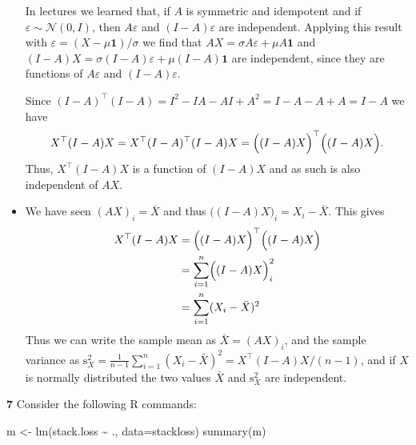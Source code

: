\documentclass[
  a4paper,
]{article}
\newenvironment{Shaded}{\begin{snugshade}}{\end{snugshade}}
\newcommand{\AttributeTok}[1]{\textcolor[rgb]{0.77,0.63,0.00}{#1}}
\newcommand{\FunctionTok}[1]{\textcolor[rgb]{0.00,0.00,0.00}{#1}}
\newcommand{\NormalTok}[1]{#1}
\newcommand{\OtherTok}[1]{\textcolor[rgb]{0.56,0.35,0.01}{#1}}
\newcommand{\SpecialCharTok}[1]{\textcolor[rgb]{0.00,0.00,0.00}{#1}}
\theoremstyle{definition}
\theoremstyle{definition}
\theoremstyle{definition}
\theoremstyle{definition}
\theoremstyle{remark}
\begin{document}
\begin{myanswers}
\begin{itemize}
  In lectures we learned that, if \(A\) is symmetric and idempotent
  and if \(\varepsilon\sim \mathcal{N}(0, I)\), then \(A\varepsilon\) and \((I-A)\varepsilon\) are
  independent. Applying this result with
  \(\varepsilon= (X - \mu \mathbf{1}) / \sigma\) we
  find that \(AX = \sigma A\varepsilon+ \mu A \mathbf{1}\) and
  \((I-A)X = \sigma (I-A)\varepsilon+ \mu (I-A)\mathbf{1}\)
  are independent, since they are functions of \(A\varepsilon\) and \((I-A)\varepsilon\).

  Since
  \((I - A)^\top (I - A) = I^2 - I A - A I + A^2 = I - A - A + A = I - A\) we have
  \begin{equation*}
    X^\top (I-A)X
    = X^\top (I - A)^\top (I-A)X
    = \Bigl( (I-A)X \Bigr)^\top \Bigl( (I-A)X \Bigr).
  \end{equation*}
  Thus, \(X^\top (I-A)X\) is a function of \((I-A)X\) and as such is
  also independent of \(AX\).
\item
  We have seen \((AX)_i = \bar X\) and thus
  \(\bigl((I - A)X\bigr)_i = X_i - \bar X\). This gives
  \begin{align*}
    X^\top (I-A)X
    &= \Bigl( (I-A)X \Bigr)^\top \Bigl( (I-A)X \Bigr) \\
    &= \sum_{i=1}^n \Bigl( (I-A)X \Bigr)_i^2 \\
    &= \sum_{i=1}^n (X_i - \bar X)^2
  \end{align*}
  Thus we can write the sample mean as \(\bar X = (AX)_i\), and the
  sample variance as
  \(\mathrm{s}_X^2 = \frac{1}{n-1} \sum_{i=1}^n (X_i - \bar X)^2 = X^\top (I-A)X / (n-1)\), and if \(X\) is normally distributed the
  two values \(\bar X\) and \(\mathrm{s}_X^2\) are independent.
\end{itemize}

\end{myanswers}

\textbf{7} Consider the following R commands:

\begin{Shaded}
\begin{Highlighting}[]
\NormalTok{m }\OtherTok{\textless{}{-}} \FunctionTok{lm}\NormalTok{(stack.loss }\SpecialCharTok{\textasciitilde{}}\NormalTok{ ., }\AttributeTok{data=}\NormalTok{stackloss)}
\FunctionTok{summary}\NormalTok{(m)}
\end{Highlighting}
\end{Shaded}
\end{document}
